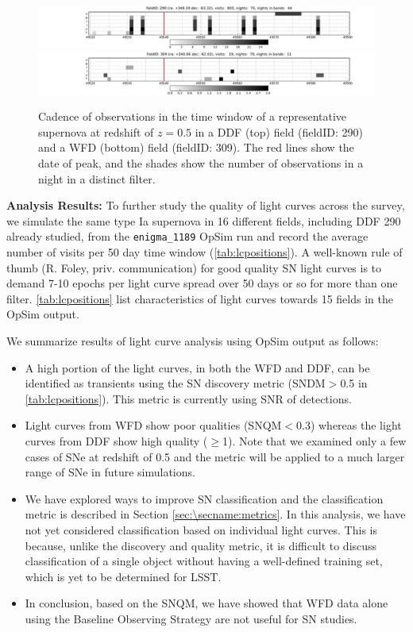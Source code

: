 \begin{figure}
\centering
\includegraphics[angle=0,width=\textwidth,clip]{figs/supernova/SN_Cadence_290.pdf}
\includegraphics[angle=0,width=\textwidth,clip]{figs/supernova/SN_Cadence_309.pdf}
\caption{Cadence of observations in the time window of a representative
supernova at redshift of $z=0.5$ in a DDF (top) field (fieldID: 290) and
a WFD (bottom) field (fieldID: 309). The red lines show the date of
peak, and the shades show the number of observations in a night in
a distinct filter.}
\label{fig:perSNCadence}
\end{figure}

{\bf Analysis Results:}
To further study the quality of light curves across the survey, we simulate the same type Ia
supernova in 16 different fields, including DDF 290 already studied, from the \texttt{enigma\_1189}
OpSim run and record the average number of visits per 50 day time window
(\autoref{tab:lcpositions}). A well-known rule of thumb (R. Foley, priv. communication) for good
quality SN light curves is to
demand 7-10 epochs per light curve spread over 50 days or so for more than one filter.
\autoref{tab:lcpositions} list characteristics of light curves towards 15 fields in the OpSim
output.

We summarize results of light curve analysis using OpSim output as follows:
\begin{itemize}
\item A high portion of the light curves, in both the WFD and DDF, can be identified as transients
using  the SN
discovery metric (SNDM$>$0.5 in \autoref{tab:lcpositions}).
This metric is currently using SNR of detections.
\item Light curves from WFD show poor qualities (SNQM$<$0.3) whereas the light curves from DDF show
high quality ($\geq$1). Note that we examined only a few cases of SNe at redshift of 0.5 and the
metric will be applied to a much larger range of SNe in future simulations.
\item We have explored ways to improve SN classification \citep{Lochner2016} and the classification
metric is described in Section
\ref{sec:\secname:metrics}.
In this analysis, we have not yet considered classification based on individual light curves.
This is because, unlike the discovery and quality metric, it is difficult to discuss
classification of a single object without having a well-defined training set, which is yet to be
determined for LSST.
\item In conclusion, based on the SNQM, we have showed that WFD data alone using the Baseline
Observing Strategy are not useful for SN studies.
\end{itemize}


